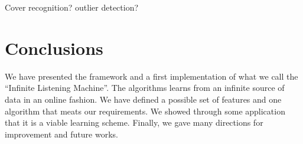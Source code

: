 \documentclass{sig-alternate}
\begin{document}
Cover recognition? outlier detection?


\section{Conclusions}
We have presented the framework and a first implementation of what
we call the ``Infinite Listening Machine''. The algorithms learns from
an infinite source of data in an online fashion. We have defined a
possible set of features and one algorithm that meats our requirements.
We showed through some application that it is a viable learning scheme.
Finally, we gave many directions for improvement and future works.


%

%
\end{document}
